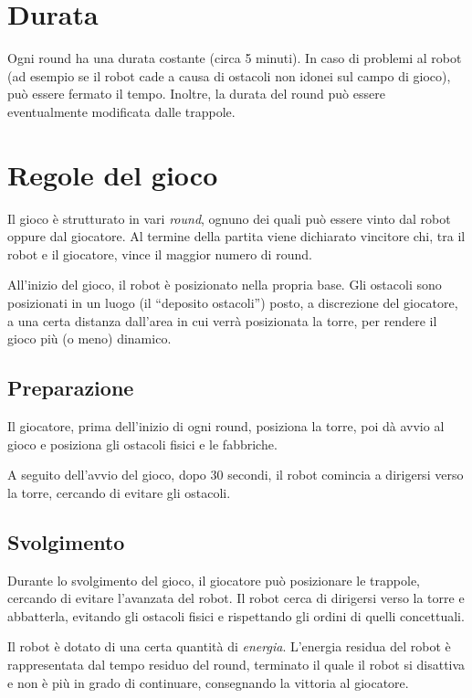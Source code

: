 \section{Durata} 
Ogni round ha una durata costante (circa 5 minuti). In caso di problemi al robot (ad esempio se il robot cade a causa di ostacoli non idonei sul campo di gioco), può essere fermato il tempo. Inoltre, la durata del round può essere eventualmente modificata dalle trappole.

\section{Regole del gioco} 
Il gioco è strutturato in vari \emph{round}, ognuno dei quali può essere vinto dal robot oppure dal giocatore. Al termine della partita viene dichiarato vincitore chi, tra il robot e il giocatore, vince il maggior numero di round. %

All'inizio del gioco, il robot è posizionato nella propria base. Gli ostacoli sono posizionati in un luogo (il ``deposito ostacoli'') posto, a discrezione del giocatore, a una certa distanza dall'area in cui verrà posizionata la torre, per rendere il gioco più (o meno) dinamico. %


	\subsection*{Preparazione}
Il giocatore, prima dell'inizio di ogni round, posiziona la torre, poi dà avvio al gioco e posiziona gli ostacoli fisici e le fabbriche.

A seguito dell'avvio del gioco, dopo 30 secondi, il robot comincia a dirigersi verso la torre, cercando di evitare gli ostacoli.
	
	\subsection*{Svolgimento}
	Durante lo svolgimento del gioco, il giocatore può posizionare le trappole, cercando di evitare l'avanzata del robot. Il robot cerca di dirigersi verso la torre e abbatterla, evitando gli ostacoli fisici e rispettando gli ordini di quelli concettuali.

Il robot è dotato di una certa quantità di \emph{energia}. L'energia residua del robot è rappresentata dal tempo residuo del round, terminato il quale il robot si disattiva e non è più in grado di continuare, consegnando la vittoria al giocatore.

